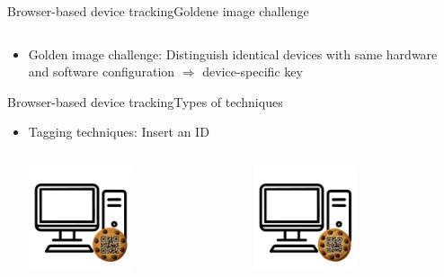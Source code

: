 \documentclass[aspectratio=169, hyperref={colorlinks=true, allcolors=SecondaryColor}, c]{beamer}
\begin{document}
\begin{frame}[fragile]{Browser-based device tracking}{Goldene image challenge}
\begin{columns}
\begin{column}{0.33\textwidth}
			\end{column}
		\end{columns}
		\vspace{-0.5cm}
		\begin{itemize}
			\item \alert{Golden image challenge:} Distinguish identical devices with same hardware and software configuration \checkboxUnchecked \alert{$\Rightarrow$ device-specific key}
		\end{itemize}
	\end{frame}

	\begin{frame}[fragile]{Browser-based device tracking}{Types of techniques}
		\begin{itemize}
			\item \alert{Tagging techniques:} Insert an ID
			\begin{columns}
				\begin{column}{0.33\textwidth}
					\includegraphics[width=0.5\textwidth, center]{./figures/computer_alpha_cookie_1.png}
				\end{column}
				\begin{column}{0.33\textwidth}
					\includegraphics[width=0.5\textwidth, center]{./figures/computer_alpha_cookie_2.png}

\end{column}
\end{columns}
\end{itemize}
\end{frame}
\end{document}

